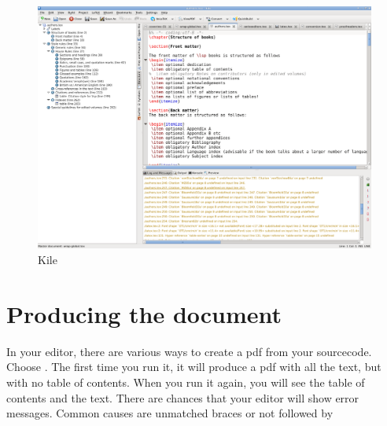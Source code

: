 \begin{figure}
\includegraphics[width=\textwidth]{kile.png}
\caption{Kile}
\label{fig:latex:kile} 
\end{figure}

  
% 
\section{Producing the document}
In your \latex editor, there are various ways to create a pdf from your sourcecode. Choose . The first time you run it, it will produce a pdf with all the text, but with no table of contents. When you run it again, you will see the table of contents and the text. There are chances that your editor will show error messages. Common causes are unmatched braces or  not followed by 

